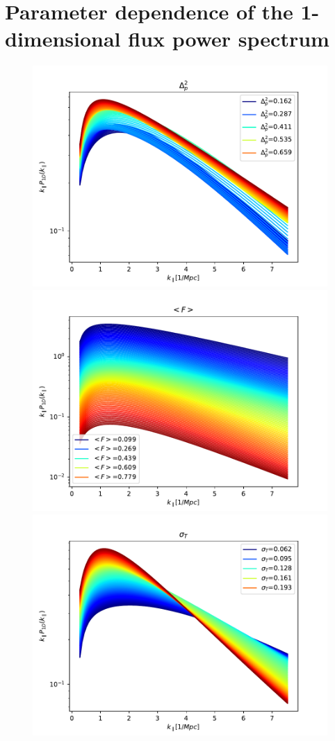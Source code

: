 \documentclass[]{article}
\begin{document}


\clearpage
\appendix
\section{Parameter dependence of the 1-dimensional flux power spectrum}
\begin{figure}[h]
    \centering
    \includegraphics[scale=0.47]{Figures/256_Delta2_p.pdf}
    \includegraphics[scale=0.47]{Figures/256_mF.pdf}
    \includegraphics[scale=0.47]{Figures/256_sigT_Mpc.pdf}

\end{figure}
\end{document}
